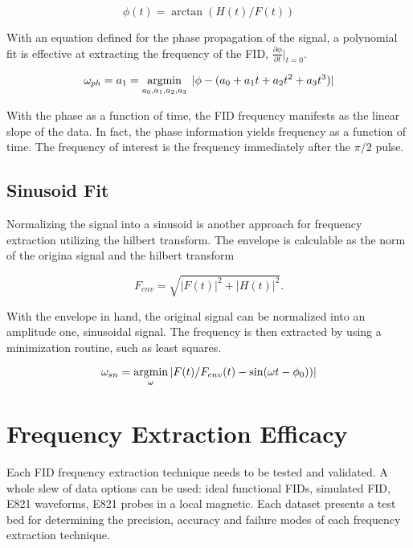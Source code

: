 \begin{equation}
\label{eqn:fid-phase}
\phi(t) = \arctan(H(t) / F(t))
\end{equation}

With an equation defined for the phase propagation of the signal, a polynomial fit is effective at extracting the frequency of the FID, $\frac{\partial \phi}{\partial t}|_{t=0}$.

\begin{equation}
\label{eqn:freq-ph}
\omega_{ph} = a_1 = \operatorname*{argmin}_{a_0, a_1, a_2, a_3} \;
|\phi - (a_0 + a_1 t + a_2 t^2 + a_3 t^3)|
\end{equation}

With the phase as a function of time, the FID frequency manifests as the linear slope of the data.  In fact, the phase information yields frequency as a function of time.  The frequency of interest is the frequency immediately after the $\pi/2$ pulse.


\subsection{Sinusoid Fit}
Normalizing the signal into a sinusoid is another approach for frequency extraction utilizing the hilbert transform.  The envelope is calculable as the norm of the origina signal and the hilbert transform

\begin{equation}
\label{eqn:fid-envelope}
F_{env} = \sqrt{|F(t)|^2 + |H(t)|^2}.
\end{equation}

\noindent 
With the envelope in hand, the original signal can be normalized into an amplitude one, sinusoidal signal.  The frequency is then extracted by using a minimization routine, such as least squares.

\begin{equation}
\label{eqn:freq-sn}
\omega_{sn} = \operatorname*{argmin}_\omega \; \\
|F(t) / F_{env}(t) - \sin(\omega t - \phi_0))|
\end{equation}


\section{Frequency Extraction Efficacy}

Each FID frequency extraction technique needs to be tested and validated.  A whole slew of data options can be used: ideal functional FIDs, simulated FID, E821 waveforms, E821 probes in a local \uw magnetic.  Each dataset presents a test bed for determining the precision, accuracy and failure modes of each frequency extraction technique.

